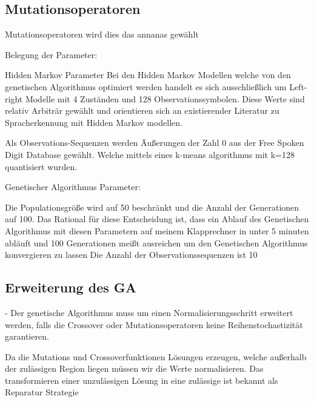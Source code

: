 \subsection*{Mutationsoperatoren}
Mutationsoperatoren wird dies das annanas gewählt


Belegung der Parameter:

Hidden Markov Parameter 
Bei den Hidden Markov Modellen welche von den genetischen Algorithmus optimiert werden handelt es sich 
ausschließlich um Left-right Modelle mit 4 Zuständen und 128 Observationssymbolen.
Diese Werte sind relativ Arbiträr gewählt und orientieren sich an existierender Literatur zu Spracherkennung mit Hidden Markov modellen.

Als Observations-Sequenzen werden Äußerungen der Zahl 0 aus der Free Spoken Digit Database gewählt.
Welche mittels eines k-means algorithmus mit k=128 quantisiert wurden.


Genetischer Algorithmus Parameter:

Die Populationsgröße wird auf 50 beschränkt und die Anzahl der Generationen auf 100.
Das Rational für diese Entscheidung ist, dass ein Ablauf des Genetischen Algorithmus mit diesen Parametern
auf meinem Klapprechner in unter 5 minuten abläuft und 100 Generationen meißt ausreichen um den Genetischen Algorithmus konvergieren zu lassen
Die Anzahl der Observationssequenzen ist 10


\subsection*{Erweiterung des GA}
- Der genetische Algorithmus muss um einen Normalisierungsschritt erweitert werden, 
falls die Crossover oder Mutationsoperatoren keine Reihenstochastizität garantieren.

Da die Mutations und Crossoverfunktionen Lösungen erzeugen, welche außerhalb der zulässigen Region liegen müssen wir die Werte normalisieren. Das transformieren einer unzulässigen Lösung in eine zulässige ist bekannt als Reparatur Strategie \cite*{MetaheuristicsEGT}